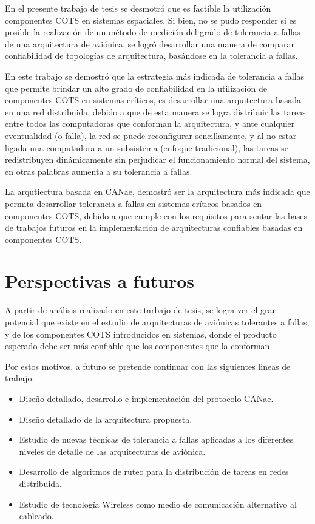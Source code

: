 En el presente trabajo de tesis se desmotró que es factible la utilización
componentes COTS en sistemas espaciales. Si bien, no se pudo responder si es
posible la realización de un método de medición del grado de tolerancia a
fallas de una arquitectura de aviónica, se logró desarrollar una manera
de comparar confiabilidad de topologías de arquitectura, basándose en la
tolerancia a fallas.

En este trabajo se demostró que la estrategia más indicada de tolerancia a
fallas que permite brindar un alto grado de confiabilidad en la utilización de
componentes COTS en sistemas críticos, es desarrollar una arquitectura basada en
una red distribuida, debido a que de esta manera se logra distribuir las tareas
entre todos las computadoras que conforman la arquitectura,
y ante cualquier eventualidad (o falla), la red se puede reconfigurar sencillamente,
y al no estar ligada una computadora a un subsistema (enfoque tradicional), las tareas
se redistribuyen dinámicamente sin perjudicar el funcionamiento normal
del sistema, en otras palabras aumenta a su tolerancia a fallas.

La arqutiectura basada en CANae, demostró ser la arquitectura más indicada que permita
desarrollar tolerancia a fallas en sistemas críticos basados en componentes COTS,
debido a que cumple con los requisitos para sentar las bases de trabajos futuros
en la implementación de arquitecturas confiables basadas en componentes COTS. 

\section{Perspectivas a futuros}
A partir de análisis realizado en este tarbajo de tesis, se logra ver el gran
potencial que existe en el estudio de arquitecturas de aviónicas tolerantes
a fallas, y de los componentes COTS introducidos en sistemas,
donde el producto esperado debe ser más confiable que los componentes
que la conforman.

Por estos motivos, a futuro se pretende continuar con las siguientes lineas de trabajo:
\begin{itemize}
\item Diseño detallado, desarrollo e implementación del protocolo CANae.
\item Diseño detallado de la arquitectura propuesta.
\item Estudio de nuevas técnicas de tolerancia a fallas aplicadas a los diferentes niveles
de detalle de las arquitecturas de aviónica.
\item Desarrollo de algoritmos de ruteo para la distribución de tareas en redes distribuida.
\item Estudio de tecnología Wireless como medio de comunicación alternativo al cableado.
\end{itemize}

